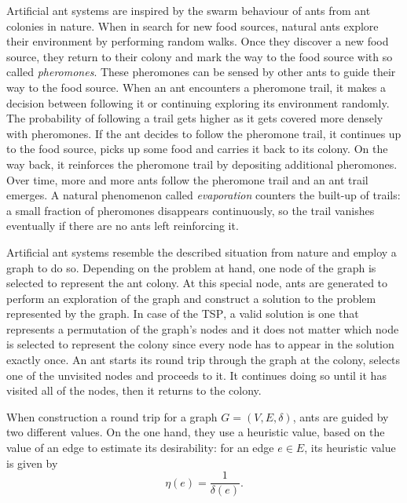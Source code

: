 Artificial ant systems are inspired by the swarm behaviour of ants from ant colonies in nature. When in search for new food sources, natural ants explore their environment by performing random walks. Once they discover a new food source, they return to their colony and mark the way to the food source with so called \textit{pheromones}. These pheromones can be sensed by other ants to guide their way to the food source. When an ant encounters a pheromone trail, it makes a decision between following it or continuing exploring its environment randomly. The probability of following a trail gets higher as it gets covered more densely with pheromones. If the ant decides to follow the pheromone trail, it continues up to the food source, picks up some food and carries it back to its colony. On the way back, it reinforces the pheromone trail by depositing additional pheromones. Over time, more and more ants follow the pheromone trail and an ant trail emerges. A natural phenomenon called \textit{evaporation} counters the built-up of trails: a small fraction of pheromones disappears continuously, so the trail vanishes eventually if there are no ants left reinforcing it.

Artificial ant systems resemble the described situation from nature and employ a graph to do so. Depending on the problem at hand, one node of the graph is selected to represent the ant colony. At this special node, ants are generated to perform an exploration of the graph and construct a solution to the problem represented by the graph. In case of the \textsc{TSP}, a valid solution is one that represents a permutation of the graph's nodes and it does not matter which node is selected to represent the colony since every node has to appear in the solution exactly once. An ant starts its round trip through the graph at the colony, selects one of the unvisited nodes and proceeds to it. It continues doing so until it has visited all of the nodes, then it returns to the colony.

When construction a round trip for a graph $G = \left( V, E, \delta \right)$, ants are guided by two different values. On the one hand, they use a heuristic value, based on the value of an edge to estimate its desirability: for an edge $e \in E$, its heuristic value is given by
\vspace*{-0.5em}
\begin{equation}
  \label{eqn:eta}
  \eta \left( e \right) = \frac{1}{\delta \left( e \right)}.
\end{equation}

